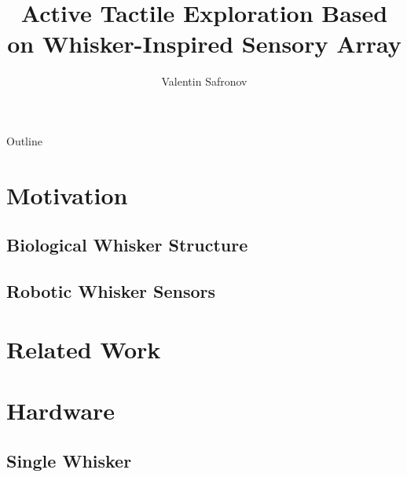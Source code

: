 \documentclass[AIRbeamer
               ,optEnglish
               ,optBiber
               ,optBibstyleAlphabetic
               ,optBeamerClassicFormat%
               ]{AIRlatex}
\title[Active Tactile Exploration Based on Whisker-Inspired Sensory Array]{Active Tactile Exploration Based on Whisker-Inspired Sensory Array}
\author[Valentin Safronov]{Valentin Safronov}
\date{\AIRutilsDate{28}{03}{2025}}
\begin{document}
\AIRbeamerTitlePageStudentThesis

\begin{frame}{Outline}
  \tableofcontents
\end{frame}


\section{Motivation}

\subsection{Biological Whisker Structure}

\subsection{Robotic Whisker Sensors}


\section{Related Work}

\section{Hardware}

\subsection{Single Whisker}
\end{document}
